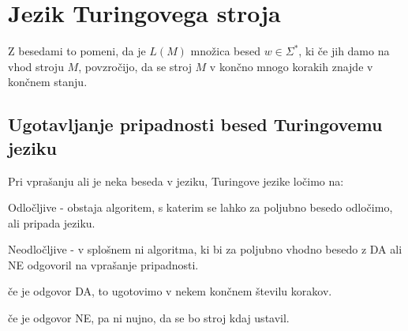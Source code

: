 \documentclass[10pt,a4paper,oneside]{book}
\begin{document}
\section{Jezik Turingovega stroja}
Z besedami to pomeni, da je $L(M)$ množica besed $w \in \Sigma^*$, ki če jih damo na vhod stroju $M$, povzročijo, da se stroj $M$ v končno mnogo korakih znajde v končnem stanju.
\subsection{Ugotavljanje pripadnosti besed Turingovemu jeziku}%
Pri vprašanju ali je neka beseda v jeziku, Turingove jezike ločimo na:
\begin{items}
\item Odločljive - obstaja algoritem, s katerim se lahko za poljubno besedo odločimo, ali pripada jeziku.
\item Neodločljive - v splošnem ni algoritma, ki bi za poljubno vhodno besedo z DA ali NE odgovoril na vprašanje pripadnosti.
	\begin{items}
	\item če je odgovor DA, to ugotovimo v nekem končnem številu korakov.
	\item če je odgovor NE, pa ni nujno, da se bo stroj kdaj ustavil.
	\end{items}
\end{items}



\end{document}
